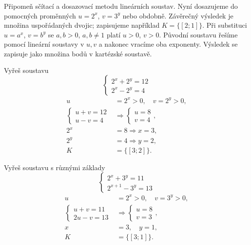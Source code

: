 \documentclass[11pt,a4paper]{article}
\begin{document}
Připomeň sčítací a dosazovací metodu lineárních soustav. Nyní dosazujeme do pomocných proměnných $u=2^x$, $v=3^y$ nebo obdobně. Závěrečný výsledek je množina uspořádaných dvojic; zapisujeme například $K=\{[2;1]\}$.
Při substituci $u=a^x$, $v=b^y$ se $a,b>0$, $a,b\ne1$ platí $u>0$, $v>0$. Původní soustavu řešíme pomocí lineární soustavy v $u,v$ a nakonec vracíme oba exponenty. Výsledek se zapisuje jako množina bodů v kartézské soustavě.
\begin{prikladReseniBox}[title={Příklad 1}]
Vyřeš soustavu \[
\begin{cases}2^x+2^y=12\\2^x-2^y=4\end{cases}
\]
\tcblower
\[
\begin{aligned}u&=2^x>0,\quad v=2^y>0,\\\begin{cases}u+v=12\\u-v=4\end{cases}&\Longrightarrow \begin{cases}u=8\\v=4\end{cases},\\2^x&=8\Rightarrow x=3,\\2^y&=4\Rightarrow y=2,\\K&=\{[3;2]\}.\end{aligned}
\]

\end{prikladReseniBox}
\begin{prikladReseniBox}[title={Příklad 2}]
Vyřeš soustavu s různými základy \[
\begin{cases}2^x+3^y=11\\2^{x+1}-3^y=13\end{cases}
\]
\tcblower
\[
\begin{aligned}u&=2^x>0,\quad v=3^y>0,\\\begin{cases}u+v=11\\2u-v=13\end{cases}&\Longrightarrow\begin{cases}u=8\\v=3\end{cases},\\x&=3,\quad y=1,\\K&=\{[3;1]\}.\end{aligned}
\]

\end{prikladReseniBox}
\end{document}
